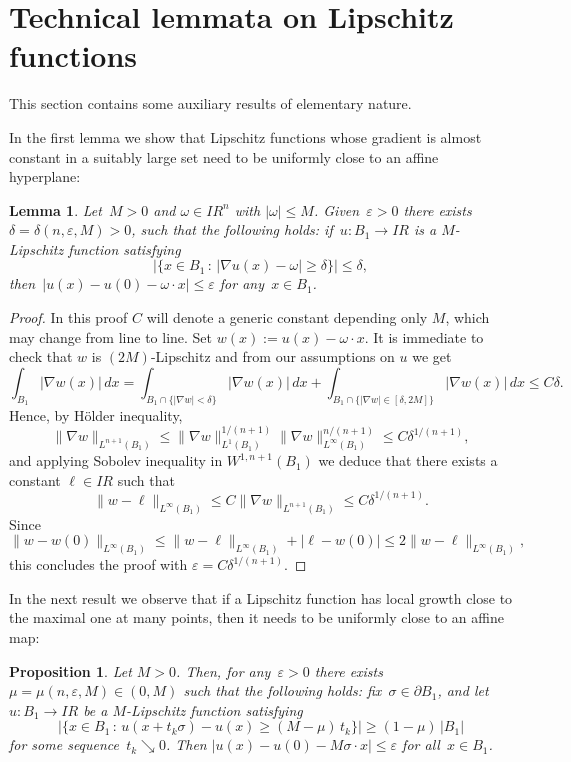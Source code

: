 \documentclass[11pt]{amsart}
\newtheorem{proposition}[theorem]{Proposition}
\newtheorem{lemma}[theorem]{Lemma}
\begin{document}
\section{Technical lemmata on Lipschitz functions}\label{S:1}

This section contains some auxiliary results
of elementary nature.

In the first lemma we show that
Lipschitz functions whose gradient is almost constant
in a suitably large set need to be uniformly close to
an affine hyperplane:

\begin{lemma}\label{Co1}
Let~$M>0$ and $\omega\in{{I\!\!R}}^n$ with $|\omega|{\leqslant} M$.
Given~${\varepsilon}>0$ there exists~${\delta}=\delta(n,{\varepsilon},M)>0$, such
that the following holds: if~$u:B_1\rightarrow{{I\!\!R}}$ is a $M$-Lipschitz function
satisfying
$$ \Big| \{ x\in B_1 \,:\, |\nabla u(x)-\omega|{\geqslant}{\delta}\}\Big|{\leqslant}{\delta},$$
then~$|u(x)-u(0)-\omega\cdot x|{\leqslant}{\varepsilon}$ for any~$x\in B_1$.
\end{lemma}

\begin{proof}
In this proof $C$ will denote a generic constant depending only $M$, which may change from line to line.
Set $w(x):=u(x)-\omega \cdot x$.
It is immediate to check that $w$ is $(2M)$-Lipschitz and from our assumptions on $u$ we get
$$
\int_{B_1}|\nabla w(x)|\,dx=
\int_{B_1\cap\{|\nabla w|<\delta\}}|\nabla w(x)|\,dx+\int_{B_1\cap\{|\nabla w|\in [\delta,2M]\}}|\nabla w(x)|\,dx
 {\leqslant} C{\delta}.
$$
Hence, by H\"older inequality,
$$
\|\nabla w\|_{L^{n+1}(B_1)}{\leqslant} \|\nabla w\|_{L^{1}(B_1)}^{1/(n+1)}\|\nabla w\|_{L^{\infty}(B_1)}^{n/(n+1)}
{\leqslant} C\delta^{1/(n+1)},
$$
and applying Sobolev inequality in $W^{1,n+1}(B_1)$ we deduce that there exists a constant $\ell \in {{I\!\!R}}$ such that
$$
\|w-\ell\|_{L^\infty(B_1)} {\leqslant} C\|\nabla w\|_{L^{n+1}(B_1)} {\leqslant} C\delta^{1/(n+1)}.
$$
Since
$$
\|w-w(0)\|_{L^\infty(B_1)}{\leqslant} \|w-\ell\|_{L^\infty(B_1)}+|\ell-w(0)| {\leqslant} 2\|w-\ell\|_{L^\infty(B_1)},
$$
this concludes the proof with ${\varepsilon}=C\delta^{1/(n+1)}$.
\end{proof}

In the next result we observe that if a Lipschitz function
has local growth close
to the maximal one at many points, then it needs to be uniformly close to an affine map:

\begin{proposition}\label{PP-1}
Let $M>0$. Then, for any~${\varepsilon}>0$ there exists~$\mu=\mu(n,{\varepsilon},M)\in (0,M)$
such that the following holds: fix~$\sigma\in \partial B_1$,
and let $u:B_1\to {{I\!\!R}}$ be a $M$-Lipschitz function satisfying
\begin{equation}\label{0.01}
\Big|\big\{x\in B_1 \,:\,
u(x+t_k \sigma)-u(x){\geqslant} (M-\mu)\,t_k
\big\}\Big|{\geqslant} (1-\mu)\,|B_1|
\end{equation}
for some sequence~$t_k\searrow0$.
Then $|u(x)-u(0)-M\sigma\cdot x|{\leqslant}{\varepsilon}$ for all~$x\in B_1$.
\end{proposition}
\end{document}

